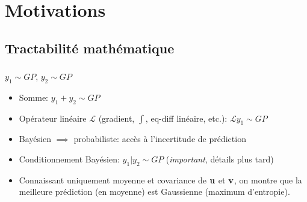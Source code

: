 \documentclass[xcolor=svgnames, t]{beamer}
\newcommand{\vectorx}[1]{\boldsymbol{\MakeLowercase{\mathbf{#1}}}}
\newcommand{\coloredemph}[1]{\textcolor{internationalblue}{\emph{#1}}}
\begin{document}
\section{Motivations}
\subsection{Tractabilité mathématique}

\begin{frame}
  \frametitle{\secname}
$y_1 \sim GP$, $y_2 \sim GP$
\begin{itemize}
  \pause
  \item Somme: $y_1 + y_2 \sim GP$
  \pause
  \item Opérateur linéaire $\mathcal{L}$ (gradient, $\int$, eq-diff linéaire, etc.):
  $\mathcal{L}y_1 \sim GP$
  \item Bayésien $\implies$ probabiliste: accès à l'incertitude de prédiction
  \pause
  \item Conditionnement Bayésien: $y_1 | y_2 \sim GP$ (\coloredemph{important}, détails plus tard)
  \pause
  \item Connaissant uniquement moyenne et covariance de $\vectorx{u}$ et $\vectorx{v}$,
  on montre que la meilleure prédiction (en moyenne) est Gaussienne (maximum d'entropie).
\end{itemize}
\end{frame}

\end{document}
